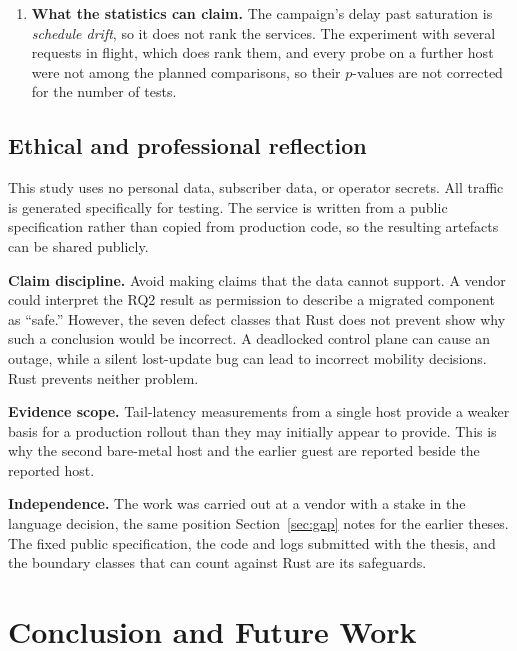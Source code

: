 \documentclass[english,oneside,a4paper,censored,csm,software-track-2020]{HYthesisML}
\begin{document}
\begin{enumerate}[label=\textbf{\arabic*.}, leftmargin=1.6em, itemsep=0.6ex, topsep=0.5ex,
  parsep=0pt]
\item \textbf{What the statistics can claim.} The campaign's delay past saturation
is \emph{schedule drift}, so it does not rank the services. The experiment with
several requests in flight, which does rank them, and every probe on a further
host were not among the planned comparisons, so their $p$-values are not
corrected for the number of tests.
\end{enumerate}

\section{Ethical and professional reflection}
This study uses no personal data, subscriber data, or operator secrets. All
traffic is generated specifically for testing. The service is written from a
public specification rather than copied from production code, so the resulting
artefacts can be shared publicly.

\begin{compactitem}
\item \textbf{Claim discipline.} Avoid making claims that the data cannot support. A vendor
could interpret the RQ2 result as permission to describe a migrated component as ``safe.''
However, the seven defect classes that Rust does not prevent show why such a conclusion would
be incorrect. A deadlocked control plane can cause an outage, while a silent lost-update bug
can lead to incorrect mobility decisions. Rust prevents neither problem.

\item \textbf{Evidence scope.} Tail-latency measurements from a single host provide a weaker
basis for a production rollout than they may initially appear to provide. This is why the
second bare-metal host and the earlier guest are reported beside the reported host.

\item \textbf{Independence.} The work was carried out at a vendor with a stake in the language
decision, the same position Section~\ref{sec:gap} notes for the earlier theses. The fixed
public specification, the code and logs submitted with the thesis, and the boundary classes
that can count against Rust are its safeguards.
\end{compactitem}

\chapter{Conclusion and Future Work\label{chapter:conclusions}}
\end{document}
